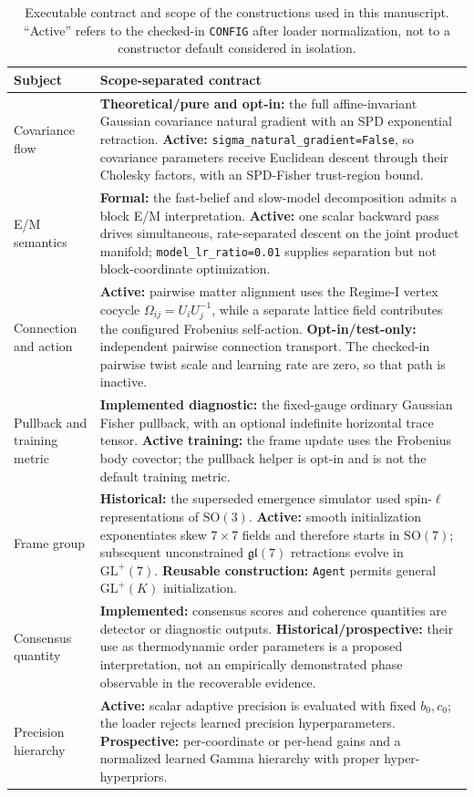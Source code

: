 \documentclass[11pt]{article}
\begin{document}
\begin{table}[t]
\centering
\small
\caption{Executable contract and scope of the constructions used in this manuscript. ``Active'' refers to the checked-in \texttt{CONFIG} after loader normalization, not to a constructor default considered in isolation.}
\label{tab:executable_contract}
\begin{tabularx}{\textwidth}{@{}p{}X@{}}
\toprule
Subject & Scope-separated contract \\
\midrule
Covariance flow & \textbf{Theoretical/pure and opt-in:} the full affine-invariant Gaussian covariance natural gradient with an SPD exponential retraction. \textbf{Active:} \texttt{sigma\_natural\_gradient=False}, so covariance parameters receive Euclidean descent through their Cholesky factors, with an SPD-Fisher trust-region bound. \\
E/M semantics & \textbf{Formal:} the fast-belief and slow-model decomposition admits a block E/M interpretation. \textbf{Active:} one scalar backward pass drives simultaneous, rate-separated descent on the joint product manifold; \texttt{model\_lr\_ratio=0.01} supplies separation but not block-coordinate optimization. \\
Connection and action & \textbf{Active:} pairwise matter alignment uses the Regime-I vertex cocycle $\Omega_{ij}=U_iU_j^{-1}$, while a separate lattice field contributes the configured Frobenius self-action. \textbf{Opt-in/test-only:} independent pairwise connection transport. The checked-in pairwise twist scale and learning rate are zero, so that path is inactive. \\
Pullback and training metric & \textbf{Implemented diagnostic:} the fixed-gauge ordinary Gaussian Fisher pullback, with an optional indefinite horizontal trace tensor. \textbf{Active training:} the frame update uses the Frobenius body covector; the pullback helper is opt-in and is not the default training metric. \\
Frame group & \textbf{Historical:} the superseded emergence simulator used spin-$\ell$ representations of $\mathrm{SO}(3)$. \textbf{Active:} smooth initialization exponentiates skew $7\times7$ fields and therefore starts in $\mathrm{SO}(7)$; subsequent unconstrained $\mathfrak{gl}(7)$ retractions evolve in $\mathrm{GL}^+(7)$. \textbf{Reusable construction:} \texttt{Agent} permits general $\mathrm{GL}^+(K)$ initialization. \\
Consensus quantity & \textbf{Implemented:} consensus scores and coherence quantities are detector or diagnostic outputs. \textbf{Historical/prospective:} their use as thermodynamic order parameters is a proposed interpretation, not an empirically demonstrated phase observable in the recoverable evidence. \\
Precision hierarchy & \textbf{Active:} scalar adaptive precision is evaluated with fixed $b_0,c_0$; the loader rejects learned precision hyperparameters. \textbf{Prospective:} per-coordinate or per-head gains and a normalized learned Gamma hierarchy with proper hyper-hyperpriors. \\
\bottomrule
\end{tabularx}
\end{table}
\end{document}
